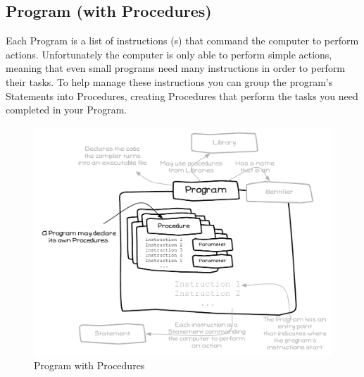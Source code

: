 \clearpage
\subsection{Program (with Procedures)} %
\label{sub:program_with_procedures_}

Each Program is a list of instructions (s) that command the computer to perform actions. Unfortunately the computer is only able to perform simple actions, meaning that even small programs need many instructions in order to perform their tasks. To help manage these instructions you can group the program's Statements into Procedures, creating Procedures that perform the tasks you need completed in your Program.

\begin{figure}[h]
   \centering
   \includegraphics[width=\textwidth]{./topics/procedure-decl/diagrams/ProgramWithProc} 
   \caption{Program with Procedures}
   \label{fig:procedure-decl-program}
\end{figure}


